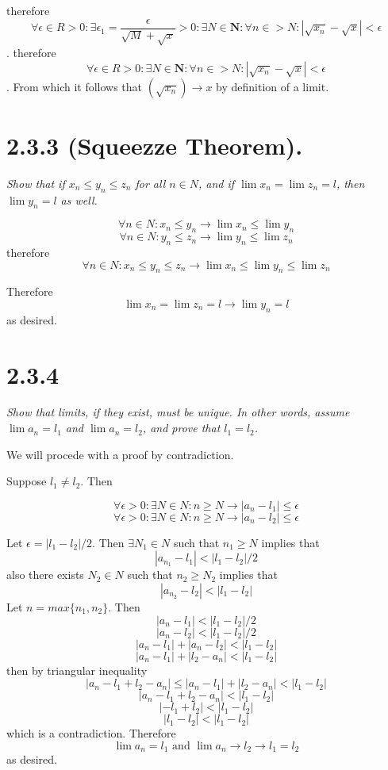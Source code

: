 \documentclass[11pt,oneside,titlepage]{book}
\begin{document}
therefore
$$\forall \epsilon \in R > 0: \exists \epsilon_1 = \frac{\epsilon}{\sqrt{M}
  + \sqrt{x}} > 0:
\exists N \in \textbf{N}: \forall n \in  > N: |\sqrt{x_n} - \sqrt{x}|
< \epsilon$$.
therefore
$$\forall \epsilon \in R > 0: 
\exists N \in \textbf{N}: \forall n \in  > N: |\sqrt{x_n} - \sqrt{x}|
< \epsilon$$.
From which it follows that $(\sqrt{x_n}) \to x$ by definition of a limit.

\section*{2.3.3 (Squeezze Theorem).}
\textit{Show that if $x_n \leq y_n \leq z_n$ for all $n \in N$, and if
  $\lim x_n = \lim z_n = l$, then $\lim y_n = l$ as well.}

$$\forall n \in N: x_n \leq y_n \to \lim x_n \leq \lim y_n$$
$$\forall n \in N: y_n \leq z_n \to \lim y_n \leq \lim z_n$$
therefore
$$\forall n \in N: x_n \leq y_n \leq z_n \to  \lim x_n \leq \lim y_n \leq \lim z_n$$

Therefore
$$\lim x_n = \lim z_n = l \to \lim y_n = l$$
as desired.

\section*{2.3.4}
\textit{Show that limits, if they exist, must be unique. In other words,
  assume $\lim a_n = l_1$ and $\lim a_n = l_2$, and prove that $l_1 = l_2$.}

We will procede with a proof by contradiction.

Suppose $l_1 \neq l_2$. Then

$$\forall \epsilon > 0: \exists N \in N: n \geq N \to |a_n - l_1| \leq \epsilon$$
$$\forall \epsilon > 0: \exists N \in N: n \geq N \to |a_n - l_2| \leq \epsilon$$

Let $\epsilon = |l_1 - l_2|/2$. Then $\exists N_1 \in N$ such that $n_1 \geq N$
implies that 
$$|a_{n_1} - l_1| < |l_1 - l_2|/2$$
also there exists $N_2 \in N$ such that  $n_2 \geq N_2$ implies that 
$$|a_{n_2} - l_2| < |l_1 - l_2|$$
Let $n = max\{n_1, n_2\}$. Then
$$|a_n - l_1| < |l_1 - l_2|/2$$
$$|a_n - l_2| < |l_1 - l_2|/2$$
$$|a_n - l_1| + |a_n - l_2| < |l_1 - l_2|$$
$$|a_n - l_1| + |l_2 - a_n| < |l_1 - l_2|$$
then by triangular inequality
$$|a_n - l_1 + l_2 - a_n| \leq |a_n - l_1| + |l_2 - a_n| < |l_1 - l_2| $$
$$|a_n - l_1 + l_2 - a_n| < |l_1 - l_2| $$
$$| - l_1 + l_2| < |l_1 - l_2| $$
$$| l_1 - l_2| < |l_1 - l_2| $$
which is a contradiction. Therefore
$$\lim a_n = l_1 \text{ and } \lim a_n \to l_2 \to l_1 = l_2$$
as desired.
\end{document}
